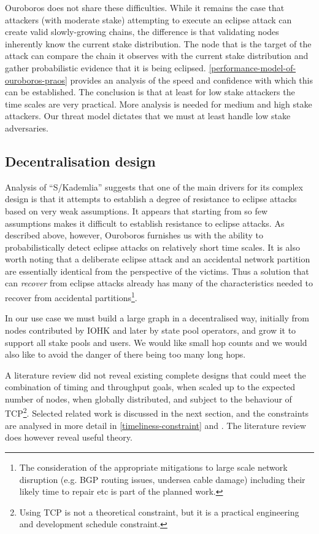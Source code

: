 \documentclass[11pt,a4paper]{article}
\begin{document}
Ouroboros does not share these difficulties. While it remains the case
that attackers (with moderate stake) attempting to execute an eclipse
attack can create valid slowly-growing chains, the difference is that
validating nodes inherently know the current stake distribution. The
node that is the target of the attack can compare the chain it observes
with the current stake distribution and gather probabilistic evidence
that it is being eclipsed.
\cref{performance-model-of-ouroboros-praos}
provides an analysis of the speed and confidence with which this can be
established. The conclusion is that at least for low stake attackers the
time scales are very practical. More analysis is needed for medium and
high stake attackers. Our threat model dictates that we must at least
handle low stake adversaries.

\subsection{Decentralisation design}
\label{decentralisation-design}

Analysis of ``S/Kademlia'' suggests that one of the main drivers for its
complex design is that it attempts to establish a degree of resistance
to eclipse attacks based on very weak assumptions. It appears that
starting from so few assumptions makes it difficult to establish
resistance to eclipse attacks. As described above, however, Ouroboros
furnishes us with the ability to probabilistically detect eclipse
attacks on relatively short time scales. It is also worth noting that a
deliberate eclipse attack and an accidental network partition are
essentially identical from the perspective of the victims. Thus a
solution that can \emph{recover} from eclipse attacks already has many
of the characteristics needed to recover from accidental
partitions\footnote{The consideration of the appropriate mitigations to
  large scale network disruption (e.g. BGP routing issues, undersea
  cable damage) including their likely time to repair etc is part of the
  planned work.}.

In our use case we must build a large graph in a decentralised way,
initially from nodes contributed by IOHK and later by state pool
operators, and grow it to support all stake pools and users. We would
like small hop counts and we would also like to avoid the danger of
there being too many long hops.

A literature review did not reveal existing complete designs that could
meet the combination of timing and throughput goals, when scaled up to
the expected number of nodes, when globally distributed, and subject to
the behaviour of TCP\footnote{Using TCP is not a theoretical constraint,
  but it is a practical engineering and development schedule constraint.}.
Selected related work is discussed in the next section, and the
constraints are analysed in more detail in
\cref{timeliness-constraint} and
.
The literature review does however reveal useful theory.
\end{document}
